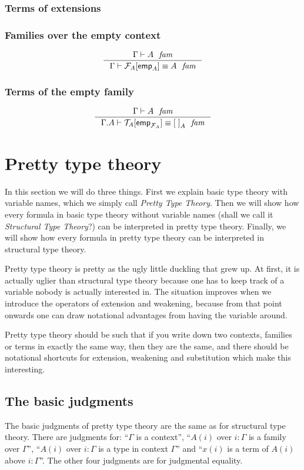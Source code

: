 \subsubsection{Terms of extensions}

\subsubsection{Families over the empty context}
\begin{equation*}
\inference
  {\jfam{\Gamma}{A}}
  {\jfameq{\Gamma}{\subst{\tfemp{A}}{\mfam{A}}}{A}}
\end{equation*}

\subsubsection{Terms of the empty family}
\begin{equation*}
\inference
  {\jfam{\Gamma}{A}}
  {\jfameq{{\Gamma}{A}}{\subst{\tfemp{\mfam{A}}}{\mtm{A}}}{\emptyf[A]}}
\end{equation*}

\section{Pretty type theory}
In this section we will do three things. First we explain basic type theory with
variable names, which we simply call \emph{Pretty Type Theory}. 
Then we will show how every formula in basic type theory without
variable names (shall we call it \emph{Structural Type Theory}?) 
can be interpreted in pretty type theory. Finally, we will show how every formula
in pretty type theory can be interpreted in structural type theory.

Pretty type theory is pretty as the ugly little duckling that grew up. At first, it is actually uglier than
structural type theory because one has to keep track of a variable nobody is
actually interested in. The situation improves when we introduce the operators
of extension and weakening, because from that point onwards one can draw notational
advantages from having the variable around.

Pretty type theory should be such that if you write down two contexts, families
or terms in exactly the same way, then they are the same, and there should be
notational shortcuts for extension, weakening and substitution which make
this interesting.

\subsection{The basic judgments}
The basic judgments of pretty type theory are the same as for structural type
theory. There are judgments for: ``$\Gamma$ is a context'',
``$A(i)$ over $i:\Gamma$ is a family over $\Gamma$'', ``$A(i)$ over $i:\Gamma$ 
is a type in context $\Gamma$''
and ``$x(i)$ is a term of $A(i)$ above $i:\Gamma$''. The other four
judgments are for judgmental equality. 

